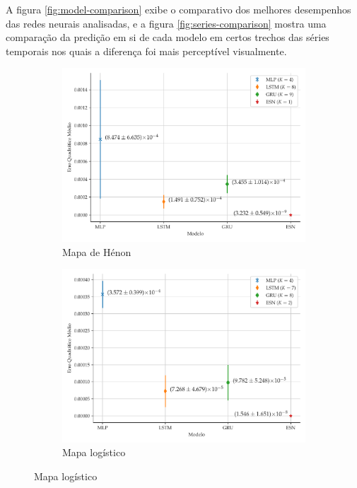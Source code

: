 \documentclass[a4paper, 12pt]{article}
\begin{document}
A figura \ref{fig:model-comparison} exibe o comparativo dos melhores desempenhos das redes neurais analisadas, e a figura \ref{fig:series-comparison} mostra uma comparação da predição em si de cada modelo em certos trechos das séries temporais nos quais a diferença foi mais perceptível visualmente.
\begin{figure}[H]
     \begin{subfigure}[t]{0.45\textwidth}
     \centering
         \includegraphics[scale=0.385]{comparacao-k-henon.pdf}
         \caption{Mapa de Hénon}
     \end{subfigure}
     \centering
     \begin{subfigure}[t]{0.45\textwidth} 
     \centering
         \includegraphics[scale=0.385]{comparacao-k-logistic.pdf}
         \caption{Mapa logístico}

\end{subfigure}
\end{figure}
\end{document}
